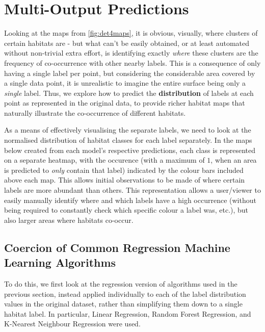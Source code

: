 


\section{Multi-Output Predictions} 
Looking at the maps from \autoref{fig:det4maps}, it is obvious, visually, where clusters of certain habitats are - but what can't be easily obtained, or at least automated without non-trivial extra effort, is identifying exactly \textit{where} these clusters are the frequency of co-occurrence with other nearby labels. This is a consequence of only having a single label per point, but considering the considerable area covered by a single data point, it is unrealistic to imagine the entire surface being only a \textit{single} label. Thus, we explore how to predict the \textbf{distribution} of labels at each point as represented in the original data, to provide richer habitat maps that naturally illustrate the co-occurrence of different habitats.

As a means of effectively visualising the separate labels, we need to look at the normalised distribution of habitat classes for each label separately. In the maps below created from each model's respective predictions, each class is represented on a separate heatmap, with the occurence (with a maximum of $1$, when an area is predicted to \textit{only} contain that label) indicated by the colour bars included above each map. This allows initial observations to be made of where certain labels are more abundant than others. This representation allows a user/viewer to easily manually identify where and which labels have a high occurrence (without being required to constantly check which specific colour a label was, etc.), but also larger areas where habitats co-occur.

\subsection{Coercion of Common Regression Machine Learning Algorithms} \label{ss:commonMLcoercion}
To do this, we first look at the regression version of algorithms used in the previous section, instead applied individually to each of the label distribution values in the original dataset, rather than simplifying them down to a single habitat label. In particular, Linear Regression, Random Forest Regression, and K-Nearest Neighbour Regression were used. 

